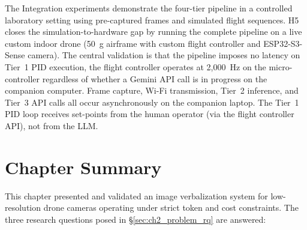 The Integration experiments demonstrate the four-tier pipeline in a controlled laboratory setting using pre-captured frames and simulated flight sequences.
H5 closes the simulation-to-hardware gap by running the complete pipeline on a live custom indoor drone (50~g airframe with custom flight controller and ESP32-S3-Sense camera). 
The central validation is that the pipeline imposes no latency on Tier~1 PID execution, the flight controller operates at 2,000~Hz on the micro-controller regardless of whether a Gemini API call is in progress on the companion computer. 
Frame capture, Wi-Fi transmission, Tier~2 inference, and Tier~3 API calls all occur asynchronously on the companion laptop.
The Tier~1 PID loop receives set-points from the human operator (via the flight controller API), not from the LLM.

\section{Chapter Summary}
\label{sec:ch2_summary}

This chapter presented and validated an image verbalization system for low-resolution drone cameras operating under strict token and cost constraints.
The three research questions posed in \S\ref{sec:ch2_problem_rq} are answered:


